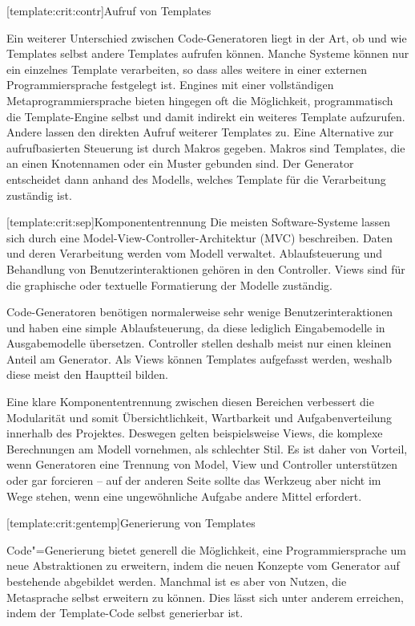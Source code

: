\documentclass[12pt, a4paper, bibgerm]{scrbook}
\newcommand\lsubsection{}
\newcommand{\cgen}{Code"=Generierung}
\begin{document}
\lsubsection[template:crit:contr]{Aufruf von Templates}

Ein weiterer Unterschied zwischen Code-Generatoren liegt in der Art, ob
und wie Templates selbst andere Templates aufrufen können. Manche
Systeme können nur ein einzelnes Template verarbeiten, so dass alles
weitere in einer externen Programmiersprache festgelegt ist. Engines mit
einer vollständigen Metaprogrammiersprache bieten hingegen oft die
Möglichkeit, programmatisch die Template-Engine selbst und damit
indirekt ein weiteres Template aufzurufen. Andere lassen den direkten
Aufruf weiterer Templates zu. Eine Alternative zur aufrufbasierten
Steuerung ist durch Makros gegeben. Makros sind Templates, die an einen
Knotennamen oder ein Muster gebunden sind. Der Generator entscheidet
dann anhand des Modells, welches Template für die Verarbeitung zuständig
ist.

\lsubsection[template:crit:sep]{Komponententrennung}
Die meisten Software-Systeme lassen sich durch eine
Model-View-Controller-Architektur (MVC) \cite[S.5ff]{DesignPatterns} beschreiben. Daten und deren
Verarbeitung werden vom Modell verwaltet. Ablaufsteuerung und Behandlung
von Benutzerinteraktionen gehören in den Controller. Views sind für die
graphische oder textuelle Formatierung der Modelle zuständig.

Code-Generatoren benötigen normalerweise sehr wenige
Benutzerinteraktionen und haben eine simple Ablaufsteuerung, da diese
lediglich Eingabemodelle in Ausgabemodelle übersetzen. Controller
stellen deshalb meist nur einen kleinen Anteil am Generator. Als Views
können Templates aufgefasst werden, weshalb diese meist den Hauptteil
bilden.

Eine klare Komponententrennung zwischen diesen Bereichen verbessert die
Modularität und somit Übersichtlichkeit, Wartbarkeit und
Aufgabenverteilung innerhalb des Projektes. Deswegen gelten
beispielsweise Views, die komplexe Berechnungen am Modell vornehmen, als
schlechter Stil. Es ist daher von Vorteil, wenn Generatoren eine
Trennung von Model, View und Controller unterstützen oder gar forcieren
-- auf der anderen Seite sollte das Werkzeug aber nicht im Wege stehen, wenn
eine ungewöhnliche Aufgabe andere Mittel erfordert.

\lsubsection[template:crit:gentemp]{Generierung von Templates}

\cgen{} bietet generell die Möglichkeit, eine Programmiersprache um neue
Abstraktionen zu erweitern, indem die neuen Konzepte vom Generator auf
bestehende abgebildet werden. Manchmal ist es aber von Nutzen, die
Metasprache selbst erweitern zu können. Dies lässt sich unter anderem
erreichen, indem der Template-Code selbst generierbar ist.
\end{document}
